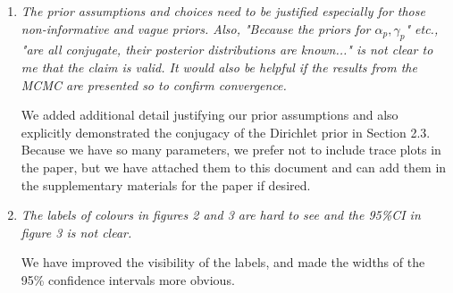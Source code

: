 \documentclass{article}
\begin{document}
\begin{enumerate}
\item\textit{The prior assumptions and choices need to be justified especially for those non-informative and vague priors. Also, "Because the priors for $\alpha_p, \gamma_p$" etc., "are all conjugate, their posterior distributions are known..." is not clear to me that the claim is valid. It would also be helpful if the results from the MCMC are presented so to confirm convergence.}

We added additional detail justifying our prior assumptions and also explicitly demonstrated the conjugacy of the Dirichlet prior in Section 2.3. Because we have so many parameters, we prefer not to include trace plots in the paper, but we have attached them to this document and can add them in the supplementary materials for the paper if desired. 

\item\textit{The labels of colours in figures 2 and 3 are hard to see and the 95\%CI in figure 3 is not clear.}

We have improved the visibility of the labels, and made the widths of the 95\% confidence intervals more obvious. 

\end{enumerate}
\end{document}
